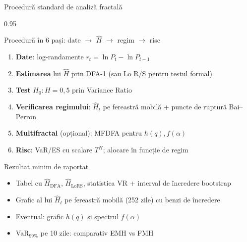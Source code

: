 \documentclass[9pt, aspectratio=169, t]{beamer}
\begin{document}
\begin{frame}[shrink=15]{Procedură standard de analiză fractală}
\begin{cminipage}{0.95\textwidth}
\begin{block}{Procedură în 6 pași: date $\to$ $\hat H$ $\to$ regim $\to$ risc}
\begin{enumerate}\setlength{\itemsep}{2pt}
    \item \textbf{Date}: log-randamente $r_t=\ln P_t-\ln P_{t-1}$
    \item \textbf{Estimarea} lui $\hat H$ prin DFA-1 (sau Lo R/S pentru testul formal)
    \item \textbf{Test} $H_0:H=0{,}5$ prin Variance Ratio
    \item \textbf{Verificarea regimului}: $\hat H_t$ pe fereastră mobilă + puncte de ruptură Bai--Perron
    \item \textbf{Multifractal} (opțional): MFDFA pentru $h(q),f(\alpha)$
    \item \textbf{Risc}: VaR/ES cu scalare $T^H$; alocare în funcție de regim
\end{enumerate}
\end{block}
\begin{exampleblock}{Rezultat minim de raportat}
\begin{itemize}\setlength{\itemsep}{0pt}
    \item Tabel cu $\hat H_{\text{DFA}}$, $\hat H_{\text{LoRS}}$, statistica VR + interval de încredere bootstrap
    \item Grafic al lui $\hat H_t$ pe fereastră mobilă (252 zile) cu benzi de încredere
    \item Eventual: grafic $h(q)$ și spectrul $f(\alpha)$
    \item VaR$_{99\%}$ pe 10 zile: comparativ EMH vs FMH
\end{itemize}
\end{exampleblock}
\end{cminipage}
\end{frame}
\end{document}
